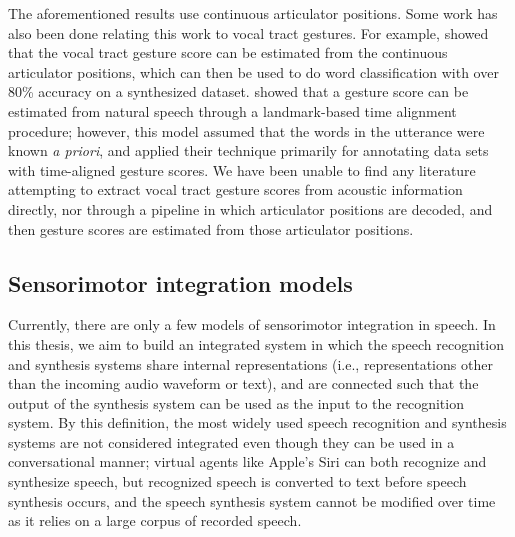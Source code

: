 The aforementioned results
use continuous articulator positions.
Some work has also been done
relating this work to
vocal tract gestures.
For example,
\citet{zhuang2008,zhuang2009}
showed that the vocal tract gesture score
can be estimated
from the continuous articulator positions,
which can then be used
to do word classification with
over 80\% accuracy on a synthesized dataset.
\citet{nam2010,nam2012}
showed that a gesture score
can be estimated from natural speech
through a landmark-based time alignment procedure;
however, this model assumed that the
words in the utterance were known \textit{a priori},
and applied their technique primarily
for annotating data sets with time-aligned gesture scores.
We have been unable to find any literature
attempting to extract vocal tract gesture scores
from acoustic information directly,
nor through a pipeline in which
articulator positions are decoded,
and then gesture scores are estimated
from those articulator positions.

\subsection{Sensorimotor integration models}
\label{sec:bg-diva-kroger}

Currently, there are only a few models
of sensorimotor integration in speech.
In this thesis, we aim to build
an integrated system
in which the speech recognition and synthesis
systems share internal representations
(i.e., representations other than
the incoming audio waveform or text),
and are connected such that
the output of the synthesis system
can be used as the input
to the recognition system.
By this definition,
the most widely used
speech recognition and synthesis systems
are not considered integrated
even though they can be used
in a conversational manner;
virtual agents like Apple's Siri
can both recognize and synthesize speech,
but recognized speech is converted
to text before speech synthesis occurs,
and the speech synthesis system
cannot be modified over time
as it relies on a large corpus
of recorded speech.

